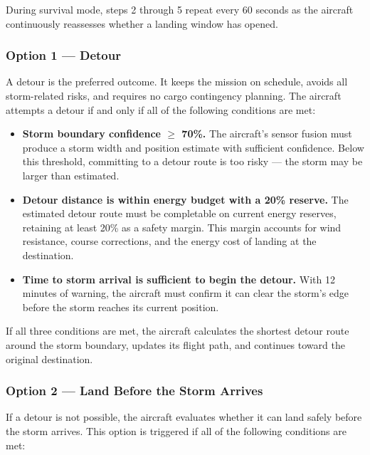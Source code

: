 \documentclass[a4paper,12pt]{article}
\begin{document}
During survival mode, steps 2 through 5 repeat every 60 seconds as the aircraft continuously
reassesses whether a landing window has opened.

\subsubsection*{Option 1 — Detour}
A detour is the preferred outcome. It keeps the mission on schedule, avoids all storm-related
risks, and requires no cargo contingency planning. The aircraft attempts a detour if and only
if all of the following conditions are met:

\begin{itemize}[itemsep=0.3em]
    \item \textbf{Storm boundary confidence $\geq$ 70\%.} The aircraft's sensor fusion must
    produce a storm width and position estimate with sufficient confidence. Below this threshold,
    committing to a detour route is too risky — the storm may be larger than estimated.

    \item \textbf{Detour distance is within energy budget with a 20\% reserve.} The estimated
    detour route must be completable on current energy reserves, retaining at least 20\% as a
    safety margin. This margin accounts for wind resistance, course corrections, and the energy
    cost of landing at the destination.

    \item \textbf{Time to storm arrival is sufficient to begin the detour.} With 12 minutes of
    warning, the aircraft must confirm it can clear the storm's edge before the storm reaches
    its current position.
\end{itemize}

If all three conditions are met, the aircraft calculates the shortest detour route around the
storm boundary, updates its flight path, and continues toward the original destination.

\subsubsection*{Option 2 — Land Before the Storm Arrives}
If a detour is not possible, the aircraft evaluates whether it can land safely before the storm
arrives. This option is triggered if all of the following conditions are met:
\end{document}
